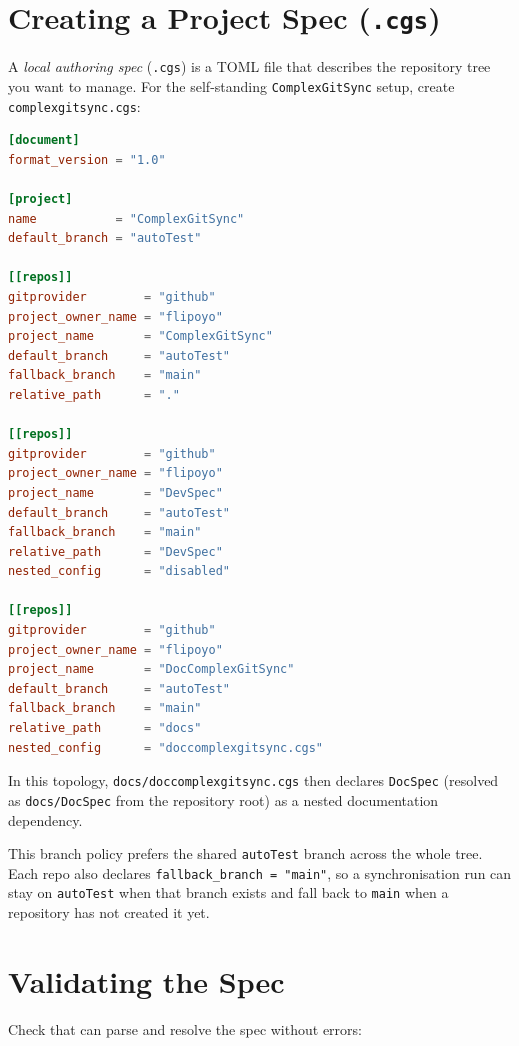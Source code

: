 \documentclass[11pt,a4paper]{article}
\begin{document}
\section{Creating a Project Spec (\texttt{.cgs})}

A \emph{local authoring spec} (\texttt{.cgs}) is a TOML file that describes
the repository tree you want to manage. For the self-standing
\texttt{ComplexGitSync} setup, create \texttt{complexgitsync.cgs}:

\begin{lstlisting}[language=toml]
[document]
format_version = "1.0"

[project]
name           = "ComplexGitSync"
default_branch = "autoTest"

[[repos]]
gitprovider        = "github"
project_owner_name = "flipoyo"
project_name       = "ComplexGitSync"
default_branch     = "autoTest"
fallback_branch    = "main"
relative_path      = "."

[[repos]]
gitprovider        = "github"
project_owner_name = "flipoyo"
project_name       = "DevSpec"
default_branch     = "autoTest"
fallback_branch    = "main"
relative_path      = "DevSpec"
nested_config      = "disabled"

[[repos]]
gitprovider        = "github"
project_owner_name = "flipoyo"
project_name       = "DocComplexGitSync"
default_branch     = "autoTest"
fallback_branch    = "main"
relative_path      = "docs"
nested_config      = "doccomplexgitsync.cgs"
\end{lstlisting}

In this topology, \texttt{docs/doccomplexgitsync.cgs} then declares
\texttt{DocSpec} (resolved as \texttt{docs/DocSpec}
from the repository root) as a nested documentation dependency.

This branch policy prefers the shared \texttt{autoTest} branch across the
whole tree. Each repo also declares \texttt{fallback\_branch = "main"}, so a
synchronisation run can stay on \texttt{autoTest} when that branch exists and
fall back to \texttt{main} when a repository has not created it yet.

\section{Validating the Spec}

Check that \cgscli{} can parse and resolve the spec without errors:
\end{document}
